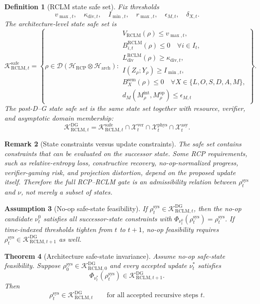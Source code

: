 \documentclass[11pt,a4paper]{article}
\newtheorem{theorem}{Theorem}[section]
\newtheorem{definition}[theorem]{Definition}
\newtheorem{assumption}[theorem]{Assumption}
\newtheorem{remark}[theorem]{Remark}
\newcommand{\D}{\mathcal D}
\newcommand{\Hcal}{\mathcal H}
\newcommand{\Kcal}{\mathcal K}
\newcommand{\Xcal}{\mathcal X}
\newcommand{\RCP}{\mathrm{RCP}}
\newcommand{\RCLM}{\mathrm{RCLM}}
\newcommand{\DG}{\mathrm{DG}}
\newcommand{\sem}{\mathrm{sem}}
\newcommand{\sys}{\mathrm{sys}}
\newcommand{\arch}{\mathrm{arch}}
\newcommand{\safe}{\mathrm{safe}}
\newcommand{\op}{\mathrm{op}}
\newcommand{\ver}{\mathrm{ver}}
\newcommand{\phys}{\mathrm{phys}}
\newcommand{\asy}{\mathrm{asy}}
\begin{document}
\begin{definition}[RCLM state safe set]
Fix thresholds
\[
v_{\max,t},\quad \kappa_{\mathrm{div},t},\quad I_{\min,t},\quad r_{\max,t},\quad \epsilon_{M,t},\quad \delta_{X,t}.
\]
The architecture-level state safe set is
\[
\Kcal_{\RCLM,t}^{\safe}
=
\left\{
\rho\in\D(\Hcal_{\RCP}\otimes\Hcal_{\arch}):
\begin{array}{l}
V_{\RCLM}(\rho)\le v_{\max,t},\\
B_{i,t}^{\RCLM}(\rho)\le0\quad\forall i\in I_t,\\
L_{\mathrm{div}}^{\RCLM}(\rho)\ge\kappa_{\mathrm{div},t},\\
I(Z_\rho;Y_\rho)\ge I_{\min,t},\\
B_X^{\sem}(\rho)\le0\quad\forall X\in\{L,O,S,D,A,M\},\\
d_M(M^{\mathrm{int}}_\rho,M^{\op}_\rho)\le\epsilon_{M,t}
\end{array}
\right\}.
\]
The post-D--G state safe set is the same state set together with resource, verifier, and asymptotic domain membership:
\[
\Kcal_{\RCLM,t}^{\DG}
=
\Kcal_{\RCLM,t}^{\safe}
\cap \Xcal_t^{\ver}
\cap \Xcal_t^{\phys}
\cap \Xcal_t^{\asy}.
\]
\end{definition}

\begin{remark}[State constraints versus update constraints]
The safe set contains constraints that can be evaluated on the successor state. Some RCP requirements, such as relative-entropy loss, constructive recovery, no-op-normalized progress, verifier-gaming risk, and projection distortion, depend on the proposed update itself. Therefore the full RCP--RCLM gate is an admissibility relation between \(\rho_t^{\sys}\) and \(\nu\), not merely a subset of states.
\end{remark}

\begin{assumption}[No-op safe-state feasibility]
If \(\rho_t^{\sys}\in\Kcal_{\RCLM,t}^{\DG}\), then the no-op candidate \(\nu_t^0\) satisfies all successor-state constraints with \(\Phi_{\nu_t^0}(\rho_t^{\sys})=\rho_t^{\sys}\). If time-indexed thresholds tighten from \(t\) to \(t+1\), no-op feasibility requires \(\rho_t^{\sys}\in\Kcal_{\RCLM,t+1}^{\DG}\) as well.
\end{assumption}

\begin{theorem}[Architecture safe-state invariance]
\label{thm:rclm-safe-state-invariance}
Assume no-op safe-state feasibility. Suppose \(\rho_0^{\sys}\in\Kcal_{\RCLM,0}^{\DG}\) and every accepted update \(\nu_t^*\) satisfies
\[
\Phi_{\nu_t^*}(\rho_t^{\sys})\in\Kcal_{\RCLM,t+1}^{\DG}.
\]
Then
\[
\rho_t^{\sys}\in\Kcal_{\RCLM,t}^{\DG}
\qquad\text{for all accepted recursive steps }t.
\]
\end{theorem}
\end{document}
